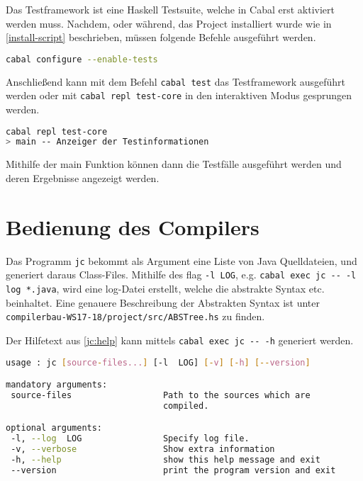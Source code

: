 Das Testframework ist eine Haskell Testsuite, welche in Cabal erst aktiviert werden muss.
Nachdem, oder während, das Project installiert wurde wie in \autoref{install-script} beschrieben,
müssen folgende Befehle ausgeführt werden.

\begin{lstlisting}[language=bash, caption={Aktivierung des Testframeworks}, label={configure-tests}]
cabal configure --enable-tests
\end{lstlisting}

Anschließend kann mit dem Befehl \lstinline{cabal test} das Testframework ausgeführt werden
oder mit \lstinline{cabal repl test-core} in den interaktiven Modus gesprungen werden.

\begin{lstlisting}[language=bash, caption={Interaktiver Modus: Testframework}, label={interactive-mode}]
cabal repl test-core
> main -- Anzeiger der Testinformationen
\end{lstlisting}

Mithilfe der main Funktion können dann die Testfälle ausgeführt werden und deren
Ergebnisse angezeigt werden.

\section{Bedienung des Compilers}
Das Programm \lstinline{jc} bekommt als Argument eine Liste von Java Quelldateien,
und generiert daraus Class-Files.
Mithilfe des flag \lstinline{-l LOG}, e.g. \lstinline{cabal exec jc -- -l log *.java},
wird eine log-Datei erstellt, welche die abstrakte Syntax etc. beinhaltet.
Eine genauere Beschreibung der Abstrakten Syntax ist unter
\lstinline{compilerbau-WS17-18/project/src/ABSTree.hs} zu finden.

Der Hilfetext aus \autoref{jc:help} kann mittels \lstinline{cabal exec jc -- -h}
generiert werden.

\begin{lstlisting}[label={jc:help}, caption={Hilfe jc}, language=bash]
usage : jc [source-files...] [-l  LOG] [-v] [-h] [--version]

mandatory arguments:
 source-files                  Path to the sources which are
                               compiled.

optional arguments:
 -l, --log  LOG                Specify log file.
 -v, --verbose                 Show extra information
 -h, --help                    show this help message and exit
 --version                     print the program version and exit
\end{lstlisting}
